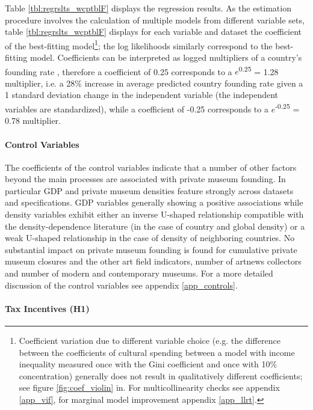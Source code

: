 \documentclass[11pt]{article}
\begin{document}
Table \ref{tbl:regrslts_wcptblF} displays the regression results. 
As the estimation procedure involves the calculation of multiple models from different variable sets, table \ref{tbl:regrslts_wcptblF} displays for each variable and dataset the coefficient of the best-fitting model\footnote{Coefficient variation due to different variable choice (e.g. the difference between the coefficients of cultural spending between a model with income inequality measured once with the Gini coefficient and once with 10\% concentration) generally does not result in qualitatively different coefficients; see figure \ref{fig:coef_violin} in. For multicollinearity checks see appendix \ref{app_vif}, for marginal model improvement appendix \ref{app_llrt}.}; the log likelihoods similarly correspond to the best-fitting model. 
Coefficients can be interpreted as logged multipliers of a country's founding rate \parencite{Coxe_West_Aiken_2009_count}, therefore a coefficient of 0.25 corresponds to a \(e\)\textsuperscript{0.25} = 1.28 multiplier, i.e. a 28\% increase in average predicted country founding rate given a 1 standard deviation change in the independent variable (the independent variables are standardized), while a coefficient of -0.25 corresponds to a \(e\)\textsuperscript{-0.25} = 0.78 multiplier.
\FloatBarrier

\paragraph*{Control Variables}

The coefficients of the control variables indicate that a number of other factors beyond the main processes are associated with private museum founding.
In particular GDP and private museum densities feature strongly across datasets and specifications.
GDP variables generally showing a positive associations while density variables exhibit either an inverse U-shaped relationship compatible with the density-dependence literature (in the case of country and global density) or a weak U-shaped relationship in the case of density of neighboring countries.
No substantial impact on private museum founding is found for cumulative private museum closures and the other art field indicators, number of artnews collectors and number of modern and contemporary museums.
For a more detailed discussion of the control variables see appendix \ref{app_controls}.



\paragraph*{Tax Incentives (H1)}
\end{document}
